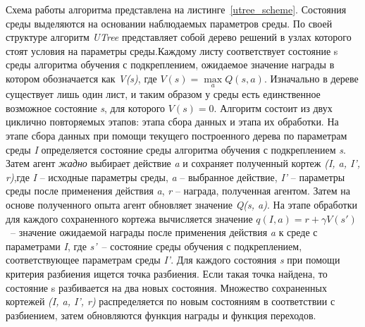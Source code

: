 Схема работы алгоритма представлена на листинге~\ref{utree_scheme}. Состояния среды выделяются на основании наблюдаемых параметров среды. По своей структуре алгоритм \textit{UTree} представляет собой дерево решений в узлах которого стоят условия на параметры среды.Каждому листу соответствует состояние s среды алгоритма обучения с подкреплением, ожидаемое значение награды в котором обозначается как \textit{V(s)}, где $V(s) = \max \limits_a Q(s,a)$. Изначально в дереве существует лишь один лист, и таким образом у среды есть единственное возможное состояние \textit{s}, для которого $V(s) = 0$. Алгоритм состоит из двух циклично повторяемых этапов: этапа сбора данных и этапа их обработки. На этапе сбора данных при помощи текущего построенного дерева по параметрам среды \textit{I} определяется состояние среды алгоритма обучения с подкреплением \textit{s}. Затем агент \textit{жадно} выбирает действие \textit{a} и сохраняет полученный кортеж \textit{(I, a, I', r)},где \textit{I} -- исходные параметры среды, \textit{a} -- выбранное действие, \textit{I'} -- параметры среды после применения действия \textit{a}, \textit{r} -- награда, полученная агентом. Затем на основе полученного опыта агент обновляет значение \textit{Q(s, a)}. На этапе обработки для каждого сохраненного кортежа вычисляется значение $q(I, a) =  r + \gamma V (s')$~-- значение ожидаемой награды после применения действия \textit{a} к среде с параметрами \textit{I}, где \textit{s'}~-- состояние среды обучения с подкреплением, соответствующее параметрам среды \textit{I'}. Для каждого состояния \textit{s} при помощи критерия разбиения ищется точка разбиения. Если такая точка найдена, то состояние s разбивается на два новых состояния. Множество сохраненных кортежей \textit{(I, a, I', r)} распределяется по новым состояниям в соответствии с разбиением, затем обновляются функция награды и функция переходов.

